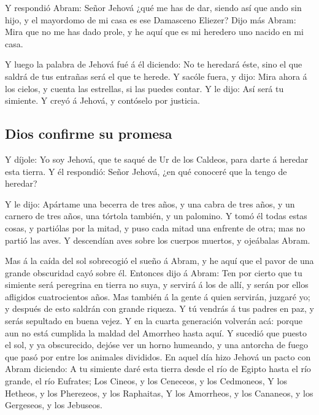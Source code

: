  Y respondió Abram: Señor Jehová ¿qué me has de dar,
siendo así que ando sin hijo, y el mayordomo de mi casa es ese Damasceno
Eliezer?  Dijo más Abram: Mira que no me has dado prole, y
he aquí que es mi heredero uno nacido en mi casa.

 Y luego la palabra de Jehová fué á él diciendo: No te
heredará éste, sino el que saldrá de tus entrañas será el que te herede.
 Y sacóle fuera, y dijo: Mira ahora á los cielos, y cuenta
las estrellas, si las puedes contar. Y le dijo: Así será tu simiente.
 Y creyó á Jehová, y contóselo por justicia.

\hypertarget{dios-confirme-su-promesa}{%
\subsection{Dios confirme su promesa}\label{dios-confirme-su-promesa}}

 Y díjole: Yo soy Jehová, que te saqué de Ur de los
Caldeos, para darte á heredar esta tierra.  Y él
respondió: Señor Jehová, ¿en qué conoceré que la tengo de heredar?

 Y le dijo: Apártame una becerra de tres años, y una cabra
de tres años, y un carnero de tres años, una tórtola también, y un
palomino.  Y tomó él todas estas cosas, y partiólas por
la mitad, y puso cada mitad una enfrente de otra; mas no partió las
aves.  Y descendían aves sobre los cuerpos muertos, y
ojeábalas Abram.

 Mas á la caída del sol sobrecogió el sueño á Abram, y he
aquí que el pavor de una grande obscuridad cayó sobre él.
 Entonces dijo á Abram: Ten por cierto que tu simiente
será peregrina en tierra no suya, y servirá á los de allí, y serán por
ellos afligidos cuatrocientos años.  Mas también á la
gente á quien servirán, juzgaré yo; y después de esto saldrán con grande
riqueza.  Y tú vendrás á tus padres en paz, y serás
sepultado en buena vejez.  Y en la cuarta generación
volverán acá: porque aun no está cumplida la maldad del Amorrheo hasta
aquí.  Y sucedió que puesto el sol, y ya obscurecido,
dejóse ver un horno humeando, y una antorcha de fuego que pasó por entre
los animales divididos.  En aquel día hizo Jehová un
pacto con Abram diciendo: A tu simiente daré esta tierra desde el río de
Egipto hasta el río grande, el río Eufrates;  Los Cineos,
y los Ceneceos, y los Cedmoneos,  Y los Hetheos, y los
Pherezeos, y los Raphaitas,  Y los Amorrheos, y los
Cananeos, y los Gergeseos, y los Jebuseos.

